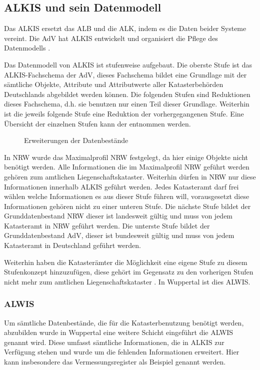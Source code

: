 \subsection{ALKIS und sein Datenmodell}
Das \acf{ALKIS} ersetzt das \acf{ALB} und die \acf{ALK}, indem es die Daten beider Systeme vereint. Die \acs{AdV} hat \acs{ALKIS} entwickelt und organisiert die Pflege des Datenmodells \autocite[vgl.][]{adv-alkis}.

Das Datenmodell von ALKIS ist stufenweise aufgebaut. Die oberste Stufe ist das ALKIS-Fachschema der AdV, dieses Fachschema bildet eine Grundlage mit der sämtliche Objekte, Attribute und Attributwerte aller Katasterbehörden Deutschlands abgebildet werden können.
Die folgenden Stufen sind Reduktionen dieses Fachschema, d.h. sie benutzen nur einen Teil dieser Grundlage. Weiterhin ist die jeweils folgende Stufe eine Reduktion der vorhergegangenen Stufe. Eine Übersicht der einzelnen Stufen kann der  entnommen werden. 

\begin{figure}[htbp]
	\centering
	\caption{Erweiterungen der Datenbestände}
	\label{fig:prod-stufen}
\end{figure}

In \ac{NRW} wurde das Maximalprofil NRW festgelegt, da hier einige Objekte nicht benötigt werden. Alle Informationen die im Maximalprofil NRW geführt werden gehören zum amtlichen Liegenschaftskataster.
Weiterhin dürfen in NRW nur diese Informationen innerhalb ALKIS geführt werden. Jedes Katasteramt darf frei wählen welche Informationen es aus dieser Stufe führen will, vorausgesetzt diese Informationen gehören nicht zu einer unteren Stufe.
Die nächste Stufe bildet der Grunddatenbestand NRW dieser ist landesweit gültig und muss von jedem Katasteramt in NRW geführt werden.
Die unterste Stufe bildet der Grunddatenbestand AdV, dieser ist bundesweit gültig und muss von jedem Katasteramt in Deutschland geführt werden.

Weiterhin haben die Katasterämter die Möglichkeit eine eigene Stufe zu diesem Stufenkonzept hinzuzufügen, diese gehört im Gegensatz zu den vorherigen Stufen nicht mehr zum amtlichen Liegenschaftskataster \autocite[vgl.][1-4]{bezk-grunddaten}. In Wuppertal ist dies \acs{ALWIS}.

\subsubsection{ALWIS}
Um sämtliche Datenbestände, die für die Katasterbenutzung benötigt werden, abzubilden wurde in Wuppertal eine weitere Schicht eingeführt die \acf{ALWIS} genannt wird. Diese umfasst sämtliche Informationen, die in ALKIS zur Verfügung stehen und wurde um die fehlenden Informationen erweitert. Hier kann insbesondere das Vermessungsregister als Beispiel genannt werden.

